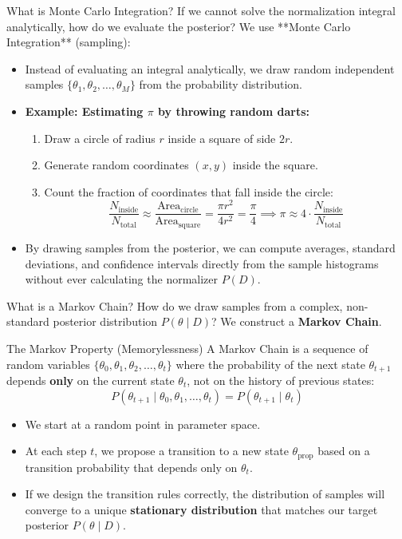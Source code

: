 \documentclass[9pt]{beamer}
\begin{document}
\begin{frame}{What is Monte Carlo Integration?}
  If we cannot solve the normalization integral analytically, how do we evaluate the posterior? We use **Monte Carlo Integration** (sampling):
  \begin{itemize}
    \item Instead of evaluating an integral analytically, we draw random independent samples $\{\theta_1, \theta_2, \dots, \theta_M\}$ from the probability distribution.
    \item \textbf{Example: Estimating $\pi$ by throwing random darts:}
      \begin{enumerate}
        \item Draw a circle of radius $r$ inside a square of side $2r$.
        \item Generate random coordinates $(x, y)$ inside the square.
        \item Count the fraction of coordinates that fall inside the circle:
          $$\frac{N_{\text{inside}}}{N_{\text{total}}} \approx \frac{\text{Area}_{\text{circle}}}{\text{Area}_{\text{square}}} = \frac{\pi r^2}{4r^2} = \frac{\pi}{4} \implies \pi \approx 4 \cdot \frac{N_{\text{inside}}}{N_{\text{total}}}$$
      \end{enumerate}
    \item By drawing samples from the posterior, we can compute averages, standard deviations, and confidence intervals directly from the sample histograms without ever calculating the normalizer $P(D)$.
  \end{itemize}
\end{frame}

\begin{frame}{What is a Markov Chain?}
  How do we draw samples from a complex, non-standard posterior distribution $P(\theta \mid D)$? We construct a \textbf{Markov Chain}.
  \begin{block}{The Markov Property (Memorylessness)}
    A Markov Chain is a sequence of random variables $\{\theta_0, \theta_1, \theta_2, \dots, \theta_t\}$ where the probability of the next state $\theta_{t+1}$ depends \textbf{only} on the current state $\theta_t$, not on the history of previous states:
    $$P(\theta_{t+1} \mid \theta_0, \theta_1, \dots, \theta_t) = P(\theta_{t+1} \mid \theta_t)$$
  \end{block}
  \begin{itemize}
    \item We start at a random point in parameter space.
    \item At each step $t$, we propose a transition to a new state $\theta_{\text{prop}}$ based on a transition probability that depends only on $\theta_t$.
    \item If we design the transition rules correctly, the distribution of samples will converge to a unique \textbf{stationary distribution} that matches our target posterior $P(\theta \mid D)$.
  \end{itemize}
\end{frame}
\end{document}
